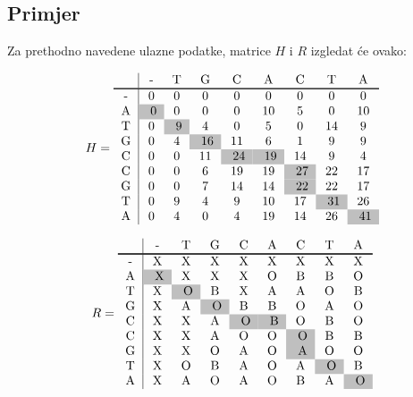 \documentclass[times, utf8, zavrsni]{fer}
\begin{document}
\subsection{Primjer}
Za prethodno navedene ulazne podatke, matrice $H$ i $R$ izgledat će ovako:

$$
H =
\begin{tabular}{c|cccccccc}
 & - & T & G & C & A & C & T & A \\\specialrule{1pt}{0pt}{0pt}
- & 0 & 0 & 0 & 0 & 0 & 0 & 0 & 0 \\ 
A & \cellcolor{lightgray} 0 & 0 & 0 & 0 & 10 & 5 & 0 & 10 \\ 
T & 0 & \cellcolor{lightgray} 9 & 4 & 0 & 5 & 0 & 14 & 9 \\ 
G & 0 & 4 & \cellcolor{lightgray} 16 & 11 & 6 & 1 & 9 & 9 \\ 
C & 0 & 0 & 11 & \cellcolor{lightgray} 24 & \cellcolor{lightgray} 19 & 14 & 9 & 4 \\ 
C & 0 & 0 & 6 & 19 & 19 & \cellcolor{lightgray} 27 & 22 & 17 \\ 
G & 0 & 0 & 7 & 14 & 14 & \cellcolor{lightgray} 22 & 22 & 17 \\ 
T & 0 & 9 & 4 & 9 & 10 & 17 & \cellcolor{lightgray} 31 & 26 \\ 
A & 0 & 4 & 0 & 4 & 19 & 14 & 26 & \cellcolor{lightgray} 41 \\ 
\end{tabular}
$$

$$
R =
\begin{tabular}{c|cccccccc}
 & - & T & G & C & A & C & T & A \\\specialrule{1pt}{0pt}{0pt}
- & X & X & X & X & X & X & X & X \\ 
A & \cellcolor{lightgray} X & X & X & X & O & B & B & O \\ 
T & X & \cellcolor{lightgray} O & B & X & A & A & O & B \\ 
G & X & A & \cellcolor{lightgray} O & B & B & O & A & O \\ 
C & X & X & A & \cellcolor{lightgray} O & \cellcolor{lightgray} B & O & B & O \\ 
C & X & X & A & O & O & \cellcolor{lightgray} O & B & B \\ 
G & X & X & O & A & O & \cellcolor{lightgray} A & O & O \\ 
T & X & O & B & A & O & A & \cellcolor{lightgray} O & B \\ 
A & X & A & O & A & O & B & A & \cellcolor{lightgray} O \\ 
\end{tabular}
$$
\end{document}
